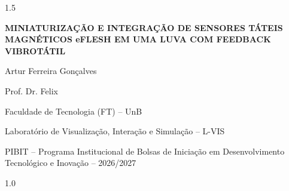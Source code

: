 \documentclass[12pt,a4paper]{article}
\newcommand{\titulo}{MINIATURIZAÇÃO E INTEGRAÇÃO DE SENSORES TÁTEIS MAGNÉTICOS eFLESH EM UMA LUVA COM FEEDBACK VIBROTÁTIL}
\newcommand{\autor}{Artur Ferreira Gonçalves}
\newcommand{\orientador}{Prof. Dr. Felix}
\newcommand{\departamento}{Faculdade de Tecnologia (FT) -- UnB}
\newcommand{\laboratorio}{Laboratório de Visualização, Interação e Simulação -- L-VIS}
\newcommand{\programa}{PIBIT -- Programa Institucional de Bolsas de Iniciação em Desenvolvimento Tecnológico e Inovação -- 2026/2027}
\begin{document}
\begin{center}
  \begin{spacing}{1.5}
    {\fontsize{14}{18}\selectfont\bfseries \titulo\par}
  \end{spacing}
  \vspace{0.6cm}
  \autor\par
  \vspace{0.3cm}
  \orientador\par
  \departamento\par
  \laboratorio\par
  \programa\par
\end{center}
\vspace{0.5cm}














\begin{spacing}{1.0}
  
\end{spacing}


\end{document}
